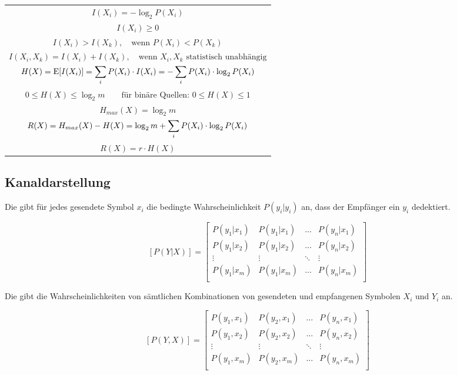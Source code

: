 \documentclass[a4paper]{article}
\begin{document}
\begin{twocolumn}
\begin{center}
\begin{tabular}{c}
  $I(X_i) = -\log_2{P(X_i)}$ \\
  $I(X_i) \geq 0$ \\
  $I(X_i) > I(X_k), \quad \text{wenn } P(X_i) < P(X_k)$ \\
  $I(X_i, X_k) = I(X_i) + I(X_k), \quad \text{wenn } X_i, X_k \text{ statistisch unabhängig}$ \\
  $\displaystyle H(X) = \operatorname{E}[I(X_i)] = \sum_i P(X_i) \cdot I(X_i) = - \sum_i P(X_i) \cdot \log_2{ P(X_i)}$ \\
  $0 \leq H(X) \leq \log_2{m} \qquad \text{für binäre Quellen: } 0 \leq H(X) \leq 1$ \\
  $H_{max}(X) = \log_2{m}$ \\
  $\displaystyle R(X) = H_{max}(X) - H(X) = \log_2{m} + \sum_i P(X_i) \cdot \log_2{P(X_i)}$ \\
  $R(X) = r \cdot H(X)$
\end{tabular}
\end{center}

\subsection{Kanaldarstellung}

Die  gibt für jedes gesendete Symbol $x_i$ die bedingte Wahrscheinlichkeit 
$P(y_i|y_i)$ an, dass der Empfänger ein $y_i$ dedektiert. 

$$[P(Y|X)] = \left[ \begin{array}{cccc} 
  P(y_1|x_1) & P(y_1|x_1) & \ldots & P(y_n|x_1) \\
  P(y_1|x_2) & P(y_1|x_2) & \ldots & P(y_n|x_2) \\
  \vdots & \vdots & \ddots & \vdots \\
  P(y_1|x_m) & P(y_1|x_m) & \ldots & P(y_n|x_m) \\
\end{array} \right]$$

Die  gibt die Wahrscheinlichkeiten von sämtlichen Kombinationen von gesendeten 
und empfangenen Symbolen $X_i$ und $Y_i$ an.

$$[P(Y,X)] = \left[ \begin{array}{cccc} 
  P(y_1,x_1) & P(y_2,x_1) & \ldots & P(y_n,x_1) \\
  P(y_1,x_2) & P(y_2,x_2) & \ldots & P(y_n,x_2) \\
  \vdots & \vdots & \ddots & \vdots \\
  P(y_1,x_m) & P(y_2,x_m) & \ldots & P(y_n,x_m) \\
\end{array} \right]$$


\end{twocolumn}
\end{document}
